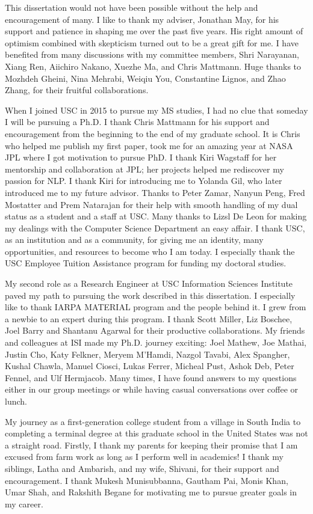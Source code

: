 
This dissertation would not have been possible without the help and encouragement of many.
I like to thank my adviser, Jonathan May, for his support and patience in shaping me over the past five years.
His right amount of optimism combined with skepticism turned out to be a great gift for me. 
I have benefited from many discussions with my committee members, Shri Narayanan, Xiang Ren, Aiichiro Nakano, Xuezhe Ma, and Chris Mattmann. Huge thanks to Mozhdeh Gheini, Nina Mehrabi, Weiqiu You, Constantine Lignos, and Zhao Zhang, for their fruitful collaborations. 

When I joined USC in 2015 to pursue my MS studies, I had no clue that someday I will be pursuing a Ph.D.
I thank Chris Mattmann for his support and encouragement from the beginning to the end of my graduate school. It is Chris who helped me publish my first paper, took me for an amazing year at NASA JPL where I got motivation to pursue PhD. I thank Kiri Wagstaff for her mentorship and collaboration at JPL; her projects helped me rediscover my passion for NLP. 
I thank Kiri for introducing me to Yolanda Gil, who later introduced me to my future advisor.
Thanks to Peter Zamar, Nanyun Peng, Fred Mostatter and Prem Natarajan for their help with smooth handling of my dual status as a student and a staff at USC. 
Many thanks to Lizsl De Leon for making my dealings with the Computer Science Department an easy affair. I thank USC, as an institution and as a community, for giving me an identity, many opportunities, and resources to become who I am today. I especially thank the USC Employee Tuition Assistance program for funding my doctoral studies. 

My second role as a Research Engineer at USC Information Sciences Institute paved my path to pursuing the work described in this dissertation. I especially like to thank IARPA MATERIAL program and the people behind it. I grew from a newbie to an expert during this program. I thank Scott Miller, Liz Boschee, Joel Barry and Shantanu Agarwal for their productive collaborations. My friends and colleagues at ISI made my Ph.D. journey exciting: Joel Mathew, Joe Mathai, Justin Cho, Katy Felkner,  Meryem M'Hamdi, Nazgol Tavabi, Alex Spangher, Kushal Chawla, Manuel Ciosci, Lukas Ferrer, Micheal Pust, Ashok Deb, Peter Fennel, and Ulf Hermjacob. Many times, I have found answers to my questions either in our group meetings or while having casual conversations over coffee or lunch.

My journey as a first-generation college student from a village in South India to completing a terminal degree at this graduate school in the United States was not a straight road. Firstly, I thank my parents for keeping their promise that I am excused from farm work as long as I perform well in academics! I thank my siblings, Latha and Ambarish, and my wife, Shivani, for their support and encouragement. I thank Mukesh Munisubbanna, Gautham Pai, Monis Khan, Umar Shah, and Rakshith Begane for motivating me to pursue greater goals in my career.